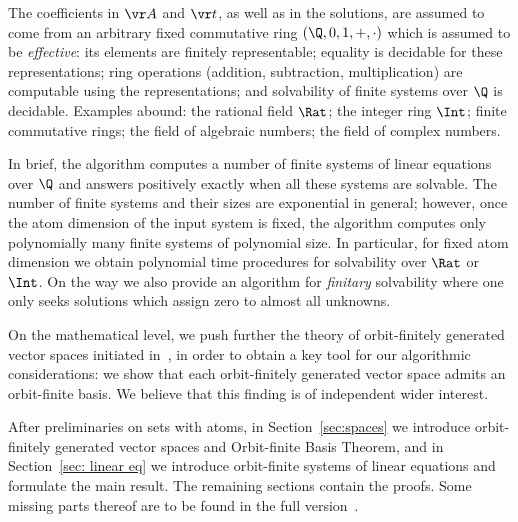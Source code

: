 The coefficients in $\vr A$ and $\vr t$, as well as in the solutions, are assumed to come from an arbitrary fixed 
commutative ring $(\Q, 0, 1, +, \cdot)$ 
which is assumed to be \emph{effective}:
its elements are finitely representable; equality is decidable for these representations;
ring operations (addition, subtraction, multiplication) are computable using the representations;
and solvability of finite systems over $\Q$ is decidable.
Examples abound: the rational field $\Rat$; the integer ring $\Int$; finite commutative rings;
the field of algebraic numbers; the field of complex numbers.

In brief, the algorithm computes a number of finite systems of linear equations over $\Q$
and answers positively exactly when all these systems are solvable.
The number of finite systems and their sizes are exponential in general;
however, once the atom dimension of the input system is fixed, the algorithm computes only polynomially many
finite systems of polynomial size.
In particular, for fixed atom dimension we obtain polynomial time procedures
for solvability over $\Rat$ or $\Int$. 
%
On the way we also provide an algorithm for \emph{finitary} solvability where one only seeks solutions which
assign zero to almost all unknowns.

On the mathematical level, we
push further the theory of orbit-finitely generated vector spaces initiated in~\cite{BKM21},
in order to obtain a key tool for our algorithmic considerations:
we show that each orbit-finitely generated vector space admits an orbit-finite basis.
We believe that this finding is of independent wider interest.

After preliminaries on sets with atoms, %
in Section~\ref{sec:spaces}
we introduce orbit-finitely generated vector spaces and  Orbit-finite Basis Theorem, and
in Section~\ref{sec: linear eq} 
we introduce orbit-finite systems of linear equations and formulate the main result. %
The remaining sections contain the proofs.
Some missing parts thereof are to be found in the full version~\cite{fullver}.


